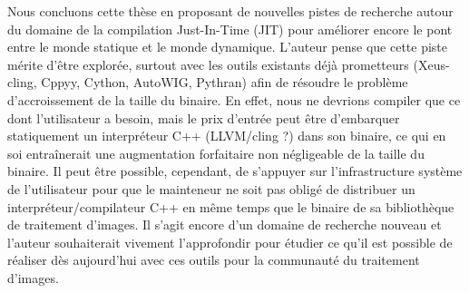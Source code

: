Nous concluons cette thèse en proposant de nouvelles pistes de recherche autour du domaine de la compilation
Just-In-Time (JIT) pour améliorer encore le pont entre le monde statique et le monde dynamique. L'auteur pense que cette
piste mérite d'être explorée, surtout avec les outils existants déjà prometteurs (Xeus-cling, Cppyy, Cython, AutoWIG,
Pythran) afin de résoudre le problème d'accroissement de la taille du binaire. En effet, nous ne devrions compiler que
ce dont l'utilisateur a besoin, mais le prix d'entrée peut être d'embarquer statiquement un interpréteur C++ (LLVM/cling
?) dans son binaire, ce qui en soi entraînerait une augmentation forfaitaire non négligeable de la taille du binaire. Il
peut être possible, cependant, de s'appuyer sur l'infrastructure système de l'utilisateur pour que le mainteneur ne soit
pas obligé de distribuer un interpréteur/compilateur C++ en même temps que le binaire de sa bibliothèque de traitement
d'images. Il s'agit encore d'un domaine de recherche nouveau et l'auteur souhaiterait vivement l'approfondir pour
étudier ce qu'il est possible de réaliser dès aujourd'hui avec ces outils pour la communauté du traitement d'images.
